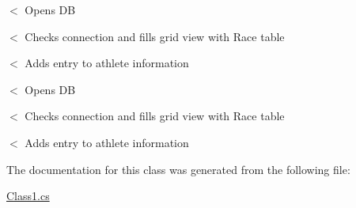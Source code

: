 $<$ Opens DB

$<$ Checks connection and fills grid view with Race table

$<$ Adds entry to athlete information

$<$ Opens DB

$<$ Checks connection and fills grid view with Race table

$<$ Adds entry to athlete information 

The documentation for this class was generated from the following file\+:\begin{DoxyCompactItemize}
\item 
\hyperlink{Class1_8cs}{Class1.\+cs}\end{DoxyCompactItemize}
